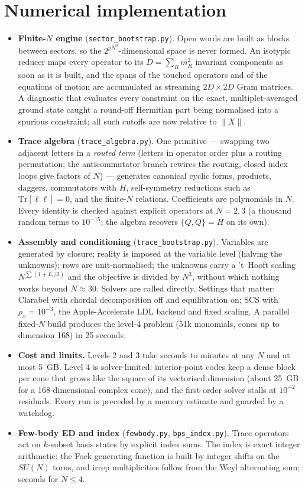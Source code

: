 \documentclass[10pt]{article}
\newcommand{\Tr}{\mathrm{Tr}}
\newcommand{\bQ}{\bar Q}
\begin{document}
\section{Numerical implementation}
\begin{itemize}
\item \textbf{Finite-$N$ engine} (\texttt{sector\_bootstrap.py}). Open words are built as blocks between sectors, so the $2^{pN^2}$-dimensional space is never formed. An isotypic reducer maps every operator to its $D=\sum_Rm_R^2$ invariant components as soon as it is built, and the spans of the touched operators and of the equations of motion are accumulated as streaming $2D\times2D$ Gram matrices. A diagnostic that evaluates every constraint on the exact, multiplet-averaged ground state caught a round-off Hermitian part being normalised into a spurious constraint; all such cutoffs are now relative to $\|X\|$.
\item \textbf{Trace algebra} (\texttt{trace\_algebra.py}). One primitive --- swapping two adjacent letters in a \emph{routed term} (letters in operator order plus a routing permutation; the anticommutator branch rewires the routing, closed index loops give factors of $N$) --- generates canonical cyclic forms, products, daggers, commutators with $H$, self-symmetry reductions such as $\Tr[\ell\ell]=0$, and the finite-$N$ relations. Coefficients are polynomials in $N$. Every identity is checked against explicit operators at $N=2,3$ (a thousand random terms to $10^{-15}$; the algebra recovers $\{Q,\bQ\}=H$ on its own).
\item \textbf{Assembly and conditioning} (\texttt{trace\_bootstrap.py}). Variables are generated by closure; reality is imposed at the variable level (halving the unknowns); rows are unit-normalised; the unknowns carry a 't~Hooft scaling $N^{\sum(1+L_i/2)}$ and the objective is divided by $N^3$, without which nothing works beyond $N\approx30$. Solvers are called directly. Settings that matter: Clarabel with chordal decomposition off and equilibration on; SCS with $\rho_x=10^{-3}$, the Apple-Accelerate LDL backend and fixed scaling. A parallel fixed-$N$ build produces the level-4 problem (51k monomials, cones up to dimension 168) in 25 seconds.
\item \textbf{Cost and limits.} Levels 2 and 3 take seconds to minutes at any $N$ and at most 5~GB. Level 4 is solver-limited: interior-point codes keep a dense block per cone that grows like the square of its vectorised dimension (about 25~GB for a 168-dimensional complex cone), and the first-order solver stalls at $10^{-2}$ residuals. Every run is preceded by a memory estimate and guarded by a watchdog.
\item \textbf{Few-body ED and index} (\texttt{fewbody.py}, \texttt{bps\_index.py}). Trace operators act on $k$-subset basis states by explicit index sums. The index is exact integer arithmetic: the Fock generating function is built by integer shifts on the $SU(N)$ torus, and irrep multiplicities follow from the Weyl alternating sum; seconds for $N\le4$.
\end{itemize}
\end{document}
